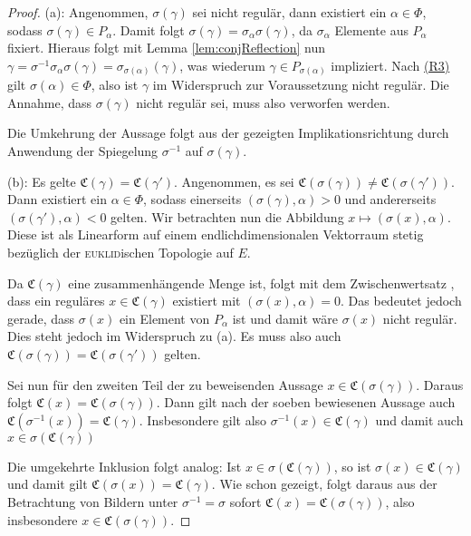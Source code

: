 \begin{proof}
  (a): 
  Angenommen, $\sigma(\gamma)$ sei nicht regulär, dann existiert ein $\alpha \in \Phi$, sodass $\sigma(\gamma) \in P_\alpha$.
  Damit folgt $\sigma(\gamma) = \sigma_\alpha \sigma(\gamma)$, da $\sigma_\alpha$ Elemente aus $P_\alpha$ fixiert.
  Hieraus folgt mit Lemma \ref{lem:conjReflection} nun $\gamma = \sigma^{-1} \sigma_\alpha \sigma(\gamma) = \sigma_{\sigma(\alpha)}(\gamma)$, was wiederum $\gamma \in P_{\sigma(\alpha)}$ impliziert.
  Nach \hyperref[it:R3]{(R3)} gilt $\sigma(\alpha) \in \Phi$, also ist $\gamma$ im Widerspruch zur Voraussetzung nicht regulär.
  Die Annahme, dass $\sigma(\gamma)$ nicht regulär sei, muss also verworfen werden.
  
  Die Umkehrung der Aussage folgt aus der gezeigten Implikationsrichtung durch Anwendung der Spiegelung $\sigma^{-1}$ auf $\sigma(\gamma)$.

  (b): 
  Es gelte $\mathfrak{C}(\gamma) = \mathfrak{C}(\gamma')$.
  Angenommen, es sei $\mathfrak{C}(\sigma(\gamma)) \neq \mathfrak{C}(\sigma(\gamma'))$.
  Dann existiert ein $\alpha \in \Phi$, sodass einerseits $(\sigma(\gamma), \alpha) > 0$ und andererseits $(\sigma(\gamma'), \alpha) < 0$ gelten.
  Wir betrachten nun die Abbildung $x \mapsto  (\sigma(x), \alpha)$.
  Diese ist als Linearform auf einem endlichdimensionalen Vektorraum stetig bezüglich der \textsc{euklid}ischen Topologie auf $E$.

  Da $\mathfrak{C}(\gamma)$ eine zusammenhängende Menge ist, folgt mit dem Zwischenwertsatz \cite[S.232]{bartsch2015allgemeine}, dass ein reguläres $x \in \mathfrak{C}(\gamma)$ existiert mit $(\sigma(x), \alpha) = 0$.
  Das bedeutet jedoch gerade, dass $\sigma(x)$ ein Element von $P_\alpha$ ist und damit wäre $\sigma(x)$ nicht regulär.
  Dies steht jedoch im Widerspruch zu (a). 
  Es muss also auch $\mathfrak{C}(\sigma(\gamma)) = \mathfrak{C}(\sigma(\gamma'))$ gelten.
  
  Sei nun für den zweiten Teil der zu beweisenden Aussage $x \in \mathfrak{C}(\sigma(\gamma))$.
  Daraus folgt $\mathfrak{C}(x) = \mathfrak{C}(\sigma(\gamma))$.
  Dann gilt nach der soeben bewiesenen Aussage auch $\mathfrak{C}(\sigma^{-1}(x)) = \mathfrak{C}(\gamma)$.
  Insbesondere gilt also $\sigma^{-1}(x) \in \mathfrak{C}(\gamma)$ und damit auch $x \in \sigma(\mathfrak{C}(\gamma))$
  
  Die umgekehrte Inklusion folgt analog: Ist $x \in \sigma(\mathfrak{C}(\gamma))$, so ist $\sigma(x) \in \mathfrak{C}(\gamma)$ und damit gilt $\mathfrak{C}(\sigma(x)) = \mathfrak{C}(\gamma)$. 
  Wie schon gezeigt, folgt daraus aus der Betrachtung von Bildern unter $\sigma^{-1} = \sigma$ sofort $\mathfrak{C}(x) = \mathfrak{C}(\sigma(\gamma))$, also insbesondere $x \in \mathfrak{C}(\sigma(\gamma))$.


\end{proof}

